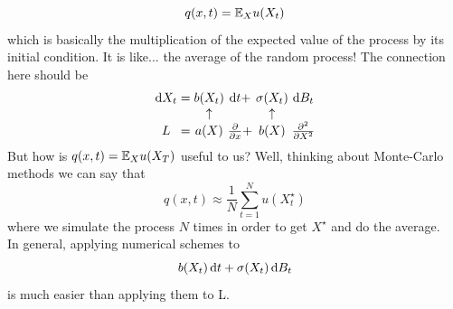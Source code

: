 \documentclass[crop=false, class=article]{standalone}
\begin{document}
\begin{equation*}
	q(x,t)=\mathbb{E}_{X}u(X_{t})
\end{equation*}
which is basically the multiplication of the expected value of the process by its initial condition. It is like... the average of the random process! The connection here should be
\begin{equation*}
	\arraycolsep=1.4pt
	\begin{array}{cccccc}
		\dif X_{t}&=&b(X_{t})&\dt+&\sigma(X_{t})&\dif B_{t}\\
		&&\uparrow&&\uparrow&\\
		L&=&a(X)&\frac{\partial}{\partial x}+&b(X)&\frac{\partial^{2}}{\partial X^{2}}
	\end{array}
\end{equation*}
But how is $q(x,t)=\mathbb{E}_{X}u(X_{T})$ useful to us? Well, thinking about Monte-Carlo methods we can say that
\begin{equation*}
	q(x,t)\approx\frac{1}{N}\sum_{t=1}^{N}u(X^{\star}_{t})
\end{equation*}
where we simulate the process $N$ times in order to get $X^{\star}$ and do the average. \\
In general, applying numerical schemes to 
\begin{equation*}
	b(X_{t})\mathop{}\!\mathrm{d} t+\sigma(X_{t})\mathop{}\!\mathrm{d} B_{t}
\end{equation*}
is much easier than applying them to L.
\end{document}
